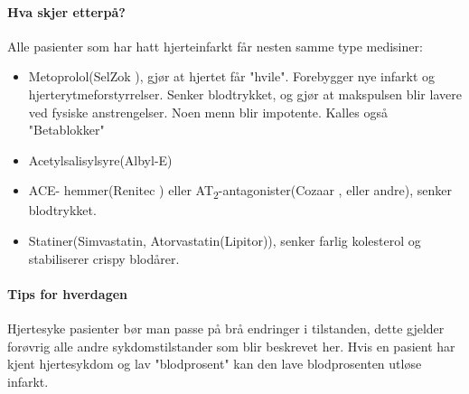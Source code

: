 				\paragraph{Hva skjer etterpå?\\}
					Alle pasienter som har hatt hjerteinfarkt får nesten samme type medisiner:
					\begin{itemize}
						\item Metoprolol(SelZok \textregistered), gjør at hjertet får "hvile". Forebygger nye infarkt og hjerterytmeforstyrrelser. Senker blodtrykket, og gjør at makspulsen blir lavere ved fysiske anstrengelser. Noen menn blir impotente. Kalles også "Betablokker"\\
						\item Acetylsalisylsyre(Albyl-E\textregistered) \\
						\item ACE- hemmer(Renitec \textregistered) eller AT\textsubscript{2}-antagonister(Cozaar \textregistered, eller andre), senker blodtrykket.\\
						\item Statiner(Simvastatin, Atorvastatin(Lipitor\textregistered)), senker farlig kolesterol og stabiliserer crispy blodårer.\\
					\end{itemize}
				\paragraph{Tips for hverdagen\\}
					Hjertesyke pasienter bør man passe på brå endringer i tilstanden, dette gjelder forøvrig alle andre sykdomstilstander som blir beskrevet her. Hvis en pasient har kjent hjertesykdom og lav "blodprosent" kan den lave blodprosenten utløse infarkt.
